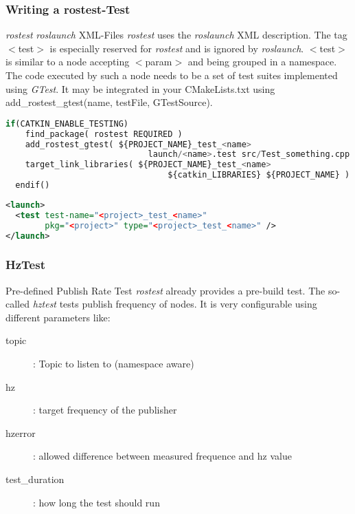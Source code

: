 \documentclass{beamer}
\begin{document}
\begin{frame}[fragile]
  \frametitle{Writing a rostest-Test}
    \begin{block}{\emph{rostest} \emph{roslaunch} XML-Files}
      \emph{rostest} uses the \emph{roslaunch} XML description. The tag {\ttfamily $<$test$>$} is especially reserved for \emph{rostest} and is ignored by \emph{roslaunch}. {\ttfamily $<$test$>$} is similar to a node accepting {\ttfamily $<$param$>$} and being grouped in a namespace. The code executed by such a node needs to be a set of test suites implemented using \emph{GTest}. It may be integrated in your {\ttfamily CMakeLists.txt} using {\ttfamily add\_rostest\_gtest(name, testFile, GTestSource)}.
    \end{block}

  \begin{lstlisting}[style=code, basicstyle=\ttfamily\tiny\color{white}, language=python]
  if(CATKIN_ENABLE_TESTING)
    find_package( rostest REQUIRED )
    add_rostest_gtest( ${PROJECT_NAME}_test_<name> 
			                 launch/<name>.test src/Test_something.cpp )
    target_link_libraries( ${PROJECT_NAME}_test_<name> 
			                     ${catkin_LIBRARIES} ${PROJECT_NAME} )
  endif()
  \end{lstlisting}
  
  \begin{lstlisting}[style=code, basicstyle=\ttfamily\scriptsize\color{white}, language=xml]
<launch>
  <test test-name="<project>_test_<name>"
        pkg="<project>" type="<project>_test_<name>" />
</launch>
\end{lstlisting}
\end{frame}

\begin{frame}
  \frametitle{HzTest}
  \begin{block}{Pre-defined Publish Rate Test}
    \emph{rostest} already provides a pre-build test. The so-called \emph{hztest} tests publish frequency of nodes. It is very configurable using different parameters like:
  \end{block}
  \begin{description}
    \item[topic]: Topic to listen to (namespace aware)
    \item[hz]: target frequency  of the publisher
    \item[hzerror]: allowed difference between measured frequence and hz value
    \item[test\_duration]: how long the test should run
  \end{description}
\end{frame}
\end{document}
